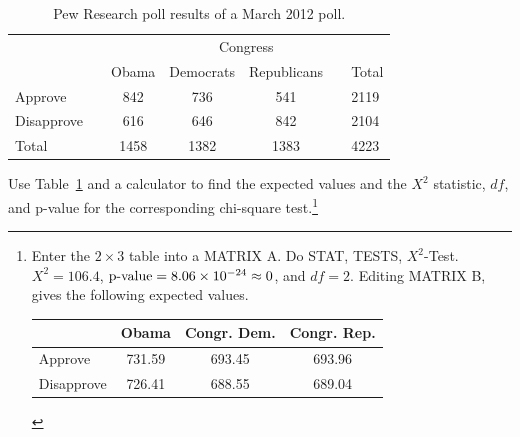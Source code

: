 \begin{table}
\begin{tabular}{ll ccc ll}
& & & \multicolumn{2}{c}{Congress} & \\
\cline{4-5}
 & \hspace{1mm} & Obama & Democrats & Republicans & \hspace{1mm} & Total \\
\hline
Approve				   & & 842    & 736 & 541   & 				& 2119 \\
Disapprove			   & & 616    & 646 & 842   &				& 2104 \\
\hline
Total					   & & 1458    & 1382 & 1383 & 				& 4223 \\
\hline
\end{tabular}
\caption{Pew Research poll results of a March 2012 poll.}
\label{pewResearchPollOnApprovalRatingsForChiSquareSectionExampleAndExercisesAgain}
\end{table}
 

\begin{exercise}
Use Table~\ref{pewResearchPollOnApprovalRatingsForChiSquareSectionExampleAndExercisesAgain} and a calculator to find the expected values and the $X^2$ statistic, $df$, and p-value for the corresponding chi-square test.\footnote{Enter the $2\times 3$ table into a MATRIX A. Do STAT, TESTS, $X^2$-Test. $X^2=106.4$, $\text{\mbox{p-value}} = 8.06 \times 10^{-24}\approx 0$, and $df=2$. Editing MATRIX B, gives the following expected values.
\begin{tabular}{l ccc}
&Obama  &Congr. Dem. & Congr. Rep. \\
\hline
Approve				    & 731.59    & 693.45 & 693.96   \\
Disapprove			    & 726.41    & 688.55 & 689.04  \\
\hline
\end{tabular}
}
\end{exercise}
